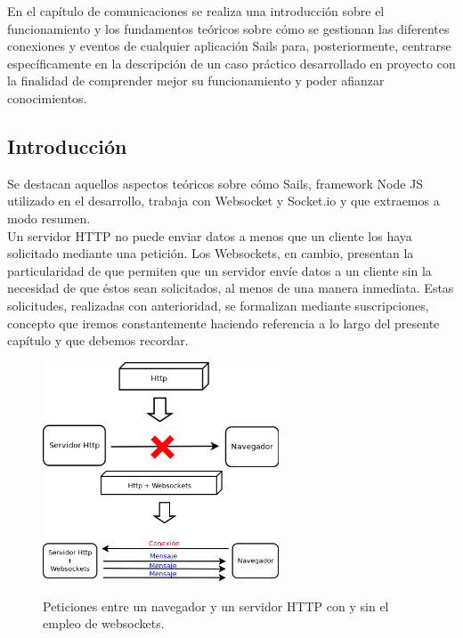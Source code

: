 \documentclass[a4paper,12pt]{article}
\begin{document}
En el capítulo de comunicaciones se realiza una introducción sobre el funcionamiento y los fundamentos teóricos sobre cómo se gestionan las diferentes conexiones y eventos de cualquier aplicación
Sails para, posteriormente, centrarse específicamente en la descripción de un caso práctico desarrollado en proyecto con la finalidad de comprender mejor su funcionamiento y poder afianzar
conocimientos.

\subsection{Introducción}

Se destacan aquellos aspectos teóricos sobre cómo Sails, framework Node JS utilizado en el desarrollo, trabaja con Websocket y Socket.io y que extraemos a modo resumen.\\

Un servidor HTTP no puede enviar datos a menos que un cliente los haya solicitado mediante una petición. Los Websockets, en cambio, presentan la particularidad de que
permiten que un servidor envíe datos a un cliente sin la necesidad de que éstos sean solicitados, al menos de una manera inmediata. Estas solicitudes, realizadas con anterioridad, se formalizan mediante suscripciones, concepto que 
iremos constantemente haciendo referencia a lo largo del presente capítulo y que debemos recordar.\\

\begin{figure}%
    \centering
    \includegraphics[width=7cm]{imagenes/http-weboscket.png}
    \qquad
    \includegraphics[width=7cm]{imagenes/http+weboscket.png}
    \caption{Peticiones entre un navegador y un servidor HTTP con y sin el empleo de websockets.}%
    \label{fig:http-request}%
\end{figure}
\end{document}
